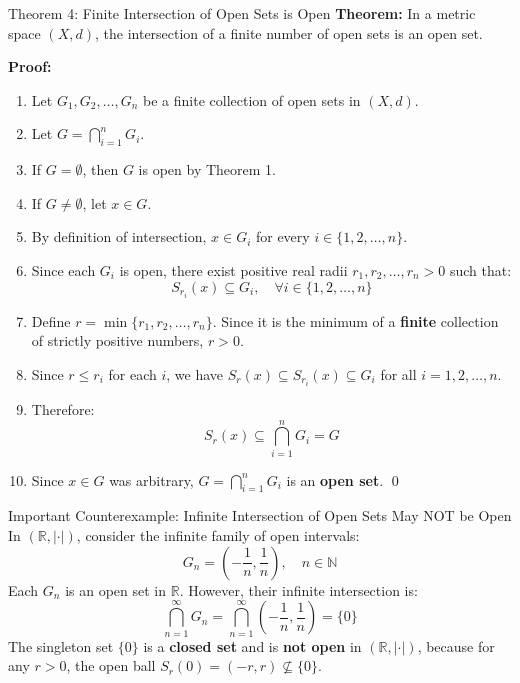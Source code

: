 \documentclass[11pt,a4paper]{article}
\begin{document}
\begin{exbox}{Theorem 4: Finite Intersection of Open Sets is Open}
\textbf{Theorem:} In a metric space $(X, d)$, the intersection of a finite number of open sets is an open set.

\textbf{Proof:}
\begin{enumerate}
    \item Let $G_1, G_2, \dots, G_n$ be a finite collection of open sets in $(X, d)$.
    \item Let $G = \bigcap_{i=1}^n G_i$.
    \item If $G = \emptyset$, then $G$ is open by Theorem 1.
    \item If $G \neq \emptyset$, let $x \in G$.
    \item By definition of intersection, $x \in G_i$ for every $i \in \{1, 2, \dots, n\}$.
    \item Since each $G_i$ is open, there exist positive real radii $r_1, r_2, \dots, r_n > 0$ such that:
    \begin{equation}
        S_{r_i}(x) \subseteq G_i, \quad \forall i \in \{1, 2, \dots, n\}
    \end{equation}
    \item Define $r = \min \{r_1, r_2, \dots, r_n\}$. Since it is the minimum of a \textbf{finite} collection of strictly positive numbers, $r > 0$.
    \item Since $r \le r_i$ for each $i$, we have $S_r(x) \subseteq S_{r_i}(x) \subseteq G_i$ for all $i = 1, 2, \dots, n$.
    \item Therefore:
    \begin{equation}
        S_r(x) \subseteq \bigcap_{i=1}^n G_i = G
    \end{equation}
    \item Since $x \in G$ was arbitrary, $G = \bigcap_{i=1}^n G_i$ is an \textbf{open set}. \qed
\end{enumerate}
\end{exbox}

\begin{formulabox}{Important Counterexample: Infinite Intersection of Open Sets May NOT be Open}
In $(\mathbb{R}, |\cdot|)$, consider the infinite family of open intervals:
\begin{equation}
    G_n = \left( -\frac{1}{n}, \frac{1}{n} \right), \quad n \in \mathbb{N}
\end{equation}
Each $G_n$ is an open set in $\mathbb{R}$. However, their infinite intersection is:
\begin{equation}
    \bigcap_{n=1}^\infty G_n = \bigcap_{n=1}^\infty \left( -\frac{1}{n}, \frac{1}{n} \right) = \{0\}
\end{equation}
The singleton set $\{0\}$ is a \textbf{closed set} and is \textbf{not open} in $(\mathbb{R}, |\cdot|)$, because for any $r > 0$, the open ball $S_r(0) = (-r, r) \not\subseteq \{0\}$.
\end{formulabox}
\end{document}
